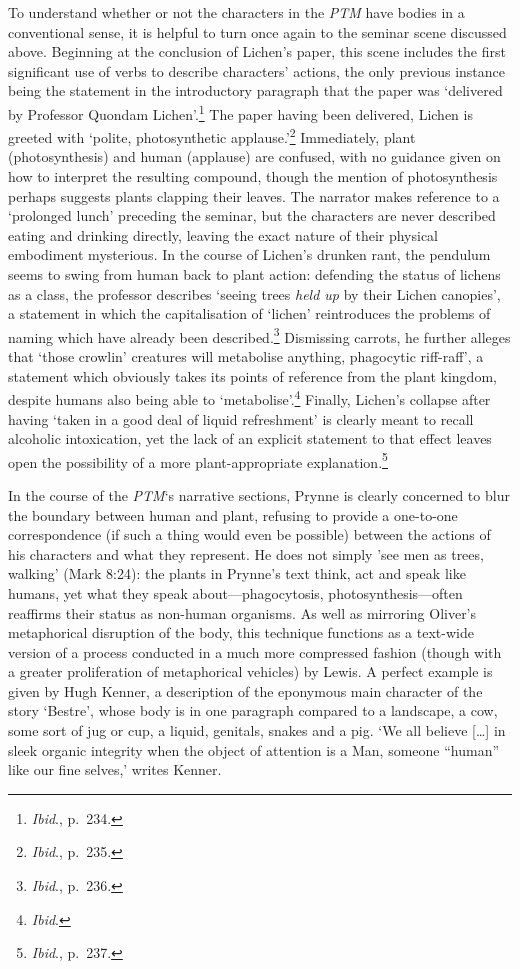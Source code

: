 \documentclass[]{article}
\begin{document}
To understand whether or not the characters in the \emph{PTM} have
bodies in a conventional sense, it is helpful to turn once again to the
seminar scene discussed above. Beginning at the conclusion of Lichen’s
paper, this scene includes the first significant use of verbs to
describe characters’ actions, the only previous instance being the
statement in the introductory paragraph that the paper was ‘delivered by
Professor Quondam Lichen’.\footnote{\emph{Ibid}., p.~234.} The paper
having been delivered, Lichen is greeted with ‘polite, photosynthetic
applause.’\footnote{\emph{Ibid}., p.~235.} Immediately, plant
(photosynthesis) and human (applause) are confused, with no guidance
given on how to interpret the resulting compound, though the mention of
photosynthesis perhaps suggests plants clapping their leaves. The
narrator makes reference to a ‘prolonged lunch’ preceding the seminar,
but the characters are never described eating and drinking directly,
leaving the exact nature of their physical embodiment mysterious. In the
course of Lichen’s drunken rant, the pendulum seems to swing from human
back to plant action: defending the status of lichens as a class, the
professor describes ‘seeing trees \emph{held up} by their Lichen
canopies’, a statement in which the capitalisation of ‘lichen’
reintroduces the problems of naming which have already been
described.\footnote{\emph{Ibid}., p.~236.} Dismissing carrots, he
further alleges that ‘those crowlin’ creatures will metabolise anything,
phagocytic riff-raff’, a statement which obviously takes its points of
reference from the plant kingdom, despite humans also being able to
‘metabolise’.\footnote{\emph{Ibid}.} Finally, Lichen’s collapse after
having ‘taken in a good deal of liquid refreshment’ is clearly meant to
recall alcoholic intoxication, yet the lack of an explicit statement to
that effect leaves open the possibility of a more plant-appropriate
explanation.\footnote{\emph{Ibid}., p.~237.}

In the course of the \emph{PTM}‘s narrative sections, Prynne is clearly
concerned to blur the boundary between human and plant, refusing to
provide a one-to-one correspondence (if such a thing would even be
possible) between the actions of his characters and what they represent.
He does not simply ’see men as trees, walking’ (Mark 8:24): the plants
in Prynne’s text think, act and speak like humans, yet what they speak
about—phagocytosis, photosynthesis—often reaffirms their status as
non-human organisms. As well as mirroring Oliver’s metaphorical
disruption of the body, this technique functions as a text-wide version
of a process conducted in a much more compressed fashion (though with a
greater proliferation of metaphorical vehicles) by Lewis. A perfect
example is given by Hugh Kenner, a description of the eponymous main
character of the story ‘Bestre’, whose body is in one paragraph compared
to a landscape, a cow, some sort of jug or cup, a liquid, genitals,
snakes and a pig. ‘We all believe {[}\ldots{}{]} in sleek organic
integrity when the object of attention is a Man, someone “human” like
our fine selves,’ writes Kenner.
\end{document}

